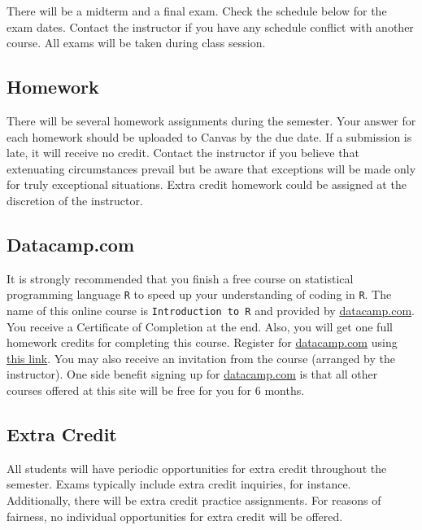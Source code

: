 \documentclass[11pt,]{article}
\begin{document}
There will be a midterm and a final exam. Check the schedule below for
the exam dates. Contact the instructor if you have any schedule conflict
with another course. All exams will be taken during class session.

\hypertarget{homework}{%
\subsection{Homework}\label{homework}}

There will be several homework assignments during the semester. Your
answer for each homework should be uploaded to Canvas by the due date.
If a submission is late, it will receive no credit. Contact the
instructor if you believe that extenuating circumstances prevail but be
aware that exceptions will be made only for truly exceptional
situations. Extra credit homework could be assigned at the discretion of
the instructor.

\hypertarget{datacamp.com}{%
\subsection{Datacamp.com}\label{datacamp.com}}

It is strongly recommended that you finish a free course on statistical
programming language \texttt{R} to speed up your understanding of coding
in \texttt{R}. The name of this online course is
\texttt{Introduction\ to\ R} and provided by \url{datacamp.com}. You
receive a Certificate of Completion at the end. Also, you will get one
full homework credits for completing this course. Register for
\url{datacamp.com} using
\href{https://www.datacamp.com/groups/shared_links/47a7ed52e9916a007f7d4935715bcb752027ec071fca98fb44eb10f407c7324}{this
link}. You may also receive an invitation from the course (arranged by
the instructor). One side benefit signing up for \url{datacamp.com} is
that all other courses offered at this site will be free for you for 6
months.

\hypertarget{extra-credit}{%
\subsection{Extra Credit}\label{extra-credit}}

All students will have periodic opportunities for extra credit
throughout the semester. Exams typically include extra credit inquiries,
for instance. Additionally, there will be extra credit practice
assignments. For reasons of fairness, no individual opportunities for
extra credit will be offered.
\end{document}
